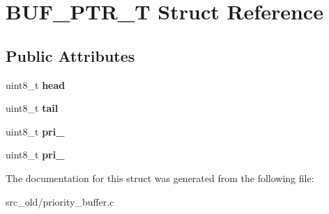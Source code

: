 \hypertarget{structBUF__PTR__T}{}\section{B\+U\+F\+\_\+\+P\+T\+R\+\_\+T Struct Reference}
\label{structBUF__PTR__T}
\subsection*{Public Attributes}
\begin{DoxyCompactItemize}
\item 
\mbox{\label{structBUF__PTR__T_a1073654611c1d41c77e937cd387561ff}} 
uint8\+\_\+t {\bfseries head}
\item 
\mbox{\label{structBUF__PTR__T_a70b162e0797f8512a8ccaf126e9b78bd}} 
uint8\+\_\+t {\bfseries tail}
\item 
\mbox{\label{structBUF__PTR__T_a89eaf3884ffa4e9b76fba591d848f17e}} 
uint8\+\_\+t {\bfseries pri\+\_}
\item 
\mbox{\label{structBUF__PTR__T_ac09b67b0b7cc897c564544fd99c06d54}} 
uint8\+\_\+t {\bfseries pri\+\_}
\end{DoxyCompactItemize}


The documentation for this struct was generated from the following file\+:\begin{DoxyCompactItemize}
\item 
src\+\_\+old/priority\+\_\+buffer.\+c\end{DoxyCompactItemize}
